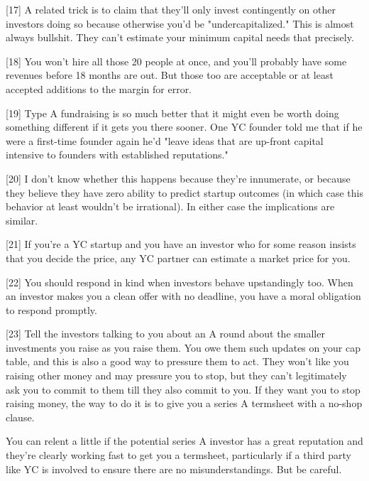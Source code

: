 [17] A related trick is to claim that they'll only invest
                  contingently on other investors doing so because otherwise
                  you'd be "undercapitalized." This is almost always bullshit.
                  They can't estimate your minimum capital needs that
                  precisely.

[18] You won't hire all those 20 people at once, and you'll
                  probably have some revenues before 18 months are out. But
                  those too are acceptable or at least accepted additions to the
                  margin for error.

[19] Type A fundraising is so much better that it might even be
                  worth doing something different if it gets you there sooner.
                  One YC founder told me that if he were a first-time founder
                  again he'd "leave ideas that are up-front capital intensive to
                  founders with established reputations."

[20] I don't know whether this happens because they're
                  innumerate, or because they believe they have zero ability to
                  predict startup outcomes (in which case this behavior at least
                  wouldn't be irrational). In either case the implications are
                  similar.

[21] If you're a YC startup and you have an investor who for
                  some reason insists that you decide the price, any YC partner
                  can estimate a market price for you.

[22] You should respond in kind when investors behave
                  upstandingly too. When an investor makes you a clean offer
                  with no deadline, you have a moral obligation to respond
                  promptly.

[23] Tell the investors talking to you about an A round about
                  the smaller investments you raise as you raise them. You owe
                  them such updates on your cap table, and this is also a good
                  way to pressure them to act. They won't like you raising other
                  money and may pressure you to stop, but they can't
                  legitimately ask you to commit to them till they also commit
                  to you. If they want you to stop raising money, the way to do
                  it is to give you a series A termsheet with a no-shop
                  clause.

You can relent a little if the potential
                  series A investor has a great reputation and they're clearly
                  working fast to get you a termsheet, particularly if a third
                  party like YC is involved to ensure there are no
                  misunderstandings. But be careful.

